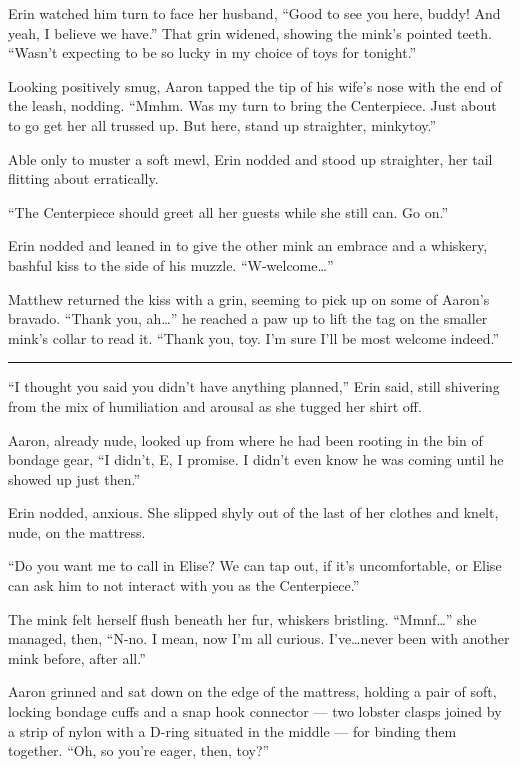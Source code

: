 Erin watched him turn to face her husband, ``Good to see you here,
buddy! And yeah, I believe we have.'' That grin widened, showing the
mink's pointed teeth. ``Wasn't expecting to be so lucky in my choice of
toys for tonight.''

Looking positively smug, Aaron tapped the tip of his wife's nose with
the end of the leash, nodding. ``Mmhm. Was my turn to bring the
Centerpiece. Just about to go get her all trussed up. But here, stand up
straighter, minkytoy.''

Able only to muster a soft mewl, Erin nodded and stood up straighter,
her tail flitting about erratically.

``The Centerpiece should greet all her guests while she still can. Go
on.''

Erin nodded and leaned in to give the other mink an embrace and a
whiskery, bashful kiss to the side of his muzzle. ``W-welcome\ldots{}''

Matthew returned the kiss with a grin, seeming to pick up on some of
Aaron's bravado. ``Thank you, ah\ldots{}'' he reached a paw up to lift
the tag on the smaller mink's collar to read it. ``Thank you, toy. I'm
sure I'll be most welcome indeed.''

\begin{center}\rule{0.5\linewidth}{\linethickness}\end{center}

``I thought you said you didn't have anything planned,'' Erin said,
still shivering from the mix of humiliation and arousal as she tugged
her shirt off.

Aaron, already nude, looked up from where he had been rooting in the bin
of bondage gear, ``I didn't, E, I promise. I didn't even know he was
coming until he showed up just then.''

Erin nodded, anxious. She slipped shyly out of the last of her clothes
and knelt, nude, on the mattress.

``Do you want me to call in Elise? We can tap out, if it's
uncomfortable, or Elise can ask him to not interact with you as the
Centerpiece.''

The mink felt herself flush beneath her fur, whiskers bristling.
``Mmnf\ldots{}'' she managed, then, ``N-no. I mean, now I'm all curious.
I've\ldots{}never been with another mink before, after all.''

Aaron grinned and sat down on the edge of the mattress, holding a pair
of soft, locking bondage cuffs and a snap hook connector --- two lobster
clasps joined by a strip of nylon with a D-ring situated in the middle
--- for binding them together. ``Oh, so you're eager, then, toy?''

